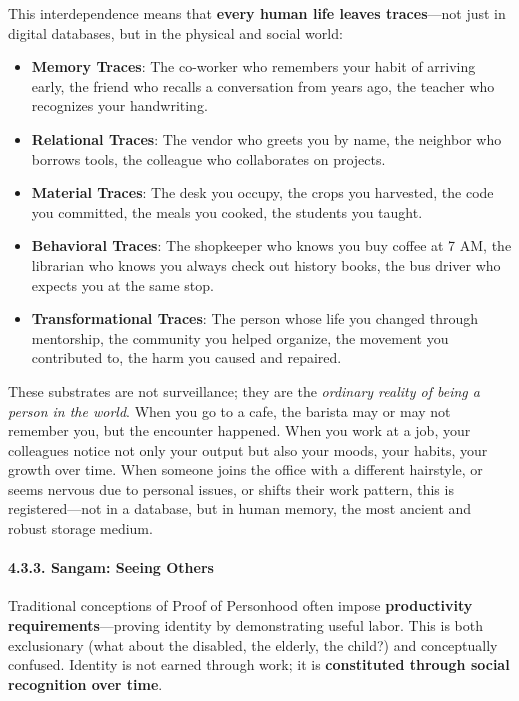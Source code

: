 This interdependence means that \textbf{every human life leaves
traces}---not just in digital databases, but in the physical and social
world:

\begin{itemize}
\tightlist
\item
  \textbf{Memory Traces}: The co-worker who remembers your habit of
  arriving early, the friend who recalls a conversation from years ago,
  the teacher who recognizes your handwriting.
\item
  \textbf{Relational Traces}: The vendor who greets you by name, the
  neighbor who borrows tools, the colleague who collaborates on
  projects.
\item
  \textbf{Material Traces}: The desk you occupy, the crops you
  harvested, the code you committed, the meals you cooked, the students
  you taught.
\item
  \textbf{Behavioral Traces}: The shopkeeper who knows you buy coffee at
  7 AM, the librarian who knows you always check out history books, the
  bus driver who expects you at the same stop.
\item
  \textbf{Transformational Traces}: The person whose life you changed
  through mentorship, the community you helped organize, the movement
  you contributed to, the harm you caused and repaired.
\end{itemize}

These substrates are not surveillance; they are the \emph{ordinary
reality of being a person in the world}. When you go to a cafe, the
barista may or may not remember you, but the encounter happened. When
you work at a job, your colleagues notice not only your output but also
your moods, your habits, your growth over time. When someone joins the
office with a different hairstyle, or seems nervous due to personal
issues, or shifts their work pattern, this is registered---not in a
database, but in human memory, the most ancient and robust storage
medium.

\paragraph{4.3.3. Sangam: Seeing Others}\label{sangam-seeing-others}

Traditional conceptions of Proof of Personhood often impose
\textbf{productivity requirements}---proving identity by demonstrating
useful labor. This is both exclusionary (what about the disabled, the
elderly, the child?) and conceptually confused. Identity is not earned
through work; it is \textbf{constituted through social recognition over
time}.

